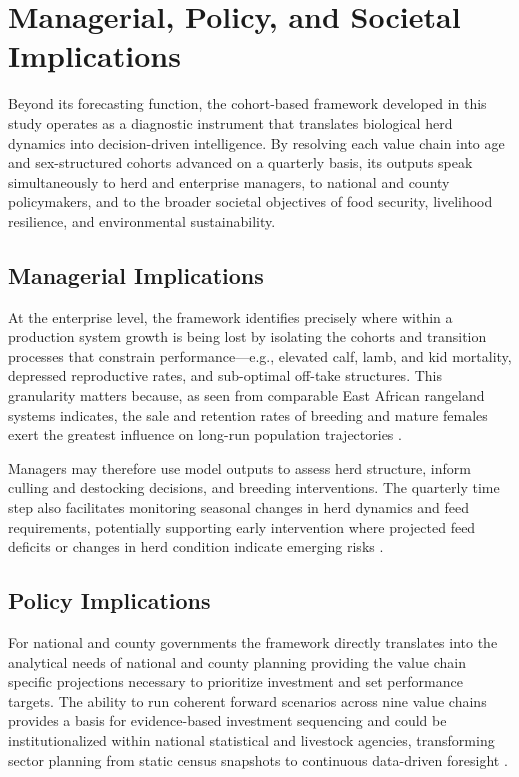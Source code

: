 \section{Managerial, Policy, and Societal Implications}

Beyond its forecasting function, the cohort-based framework developed in this study operates as a diagnostic instrument that translates biological herd dynamics into decision-driven intelligence. By resolving each value chain into age and sex-structured cohorts advanced on a quarterly basis, its outputs speak simultaneously to herd and enterprise managers, to national and county policymakers, and to the broader societal objectives of food security, livelihood resilience, and environmental sustainability.

\subsection{Managerial Implications}
At the enterprise level, the framework identifies precisely where within a production system growth is being lost by isolating the cohorts and transition processes that constrain performance---e.g., elevated calf, lamb, and kid mortality, depressed reproductive rates, and sub-optimal off-take structures. This granularity matters because, as seen from comparable East African rangeland systems indicates, the sale and retention rates of breeding and mature females exert the greatest influence on long-run population trajectories \cite{tuffa2017, hary2004}. 

Managers may therefore use model outputs to assess herd structure, inform culling and destocking decisions, and breeding interventions. The quarterly time step also facilitates monitoring seasonal changes in herd dynamics and feed requirements, potentially supporting early intervention where projected feed deficits or changes in herd condition indicate emerging risks \cite{meshesha2019}. 

\subsection{Policy Implications}
For national and county governments the framework directly translates into the analytical needs of national and county planning providing the value chain specific projections necessary to prioritize investment and set performance targets. The ability to run coherent forward scenarios across nine value chains provides a basis for evidence-based investment sequencing and could be institutionalized within national statistical and livestock agencies, transforming sector planning from static census snapshots to continuous data-driven foresight \cite{bosire2022}.

